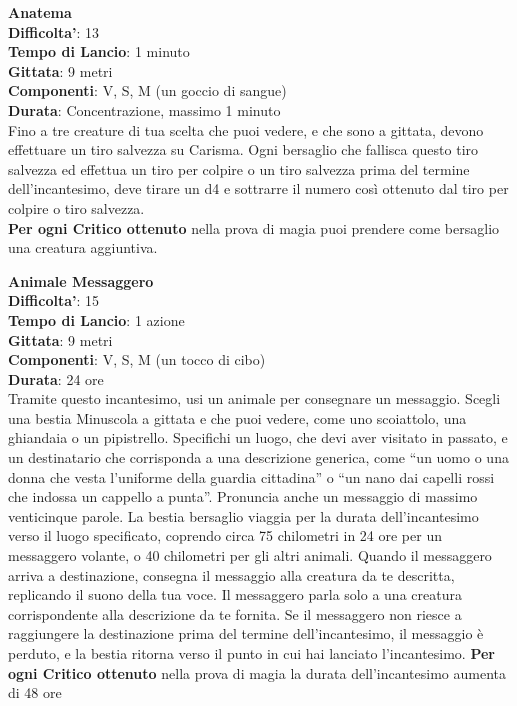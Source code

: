 \begin{multicols}{2}
\medskip\textbf{Anatema}\\
\textbf{Difficolta'}: 13\\
\textbf{Tempo di Lancio}: 1 minuto\\
\textbf{Gittata}: 9 metri\\
\textbf{Componenti}: V, S, M (un goccio di sangue)\\
\textbf{Durata}: Concentrazione, massimo 1 minuto\\
Fino a tre creature di tua scelta che puoi vedere, e che sono a gittata, devono effettuare un tiro salvezza su Carisma. Ogni bersaglio che fallisca questo tiro salvezza ed effettua un tiro per colpire o un tiro salvezza prima del termine dell’incantesimo, deve tirare un d4 e sottrarre il numero così ottenuto dal tiro per colpire o tiro salvezza.\\
\textbf{Per ogni Critico ottenuto} nella prova di magia puoi prendere come bersaglio una creatura aggiuntiva.

\medskip\textbf{Animale Messaggero}\\
\textbf{Difficolta'}: 15\\
\textbf{Tempo di Lancio}: 1 azione\\
\textbf{Gittata}: 9 metri\\
\textbf{Componenti}: V, S, M (un tocco di cibo)\\
\textbf{Durata}: 24 ore\\
Tramite questo incantesimo, usi un animale per consegnare un messaggio. Scegli una bestia Minuscola a gittata e che puoi vedere, come uno scoiattolo, una ghiandaia o un pipistrello. Specifichi un luogo, che devi aver visitato in passato, e un destinatario che corrisponda a una descrizione generica, come “un uomo o una donna che vesta l’uniforme della guardia cittadina” o “un nano dai capelli rossi che indossa un cappello a punta”. Pronuncia anche un messaggio di massimo venticinque parole. La bestia bersaglio viaggia per la durata dell’incantesimo verso il luogo specificato, coprendo circa 75 chilometri in 24 ore per un messaggero volante, o 40 chilometri per gli altri animali. Quando il messaggero arriva a destinazione, consegna il messaggio alla creatura da te descritta, replicando il suono della tua voce. Il messaggero parla solo a una creatura corrispondente alla descrizione da te fornita. Se il messaggero non riesce a raggiungere la destinazione prima del termine dell’incantesimo, il messaggio è perduto, e la bestia ritorna verso il punto in cui hai lanciato l’incantesimo.
\textbf{Per ogni Critico ottenuto} nella prova di magia la durata dell’incantesimo aumenta di 48 ore


\end{multicols}
